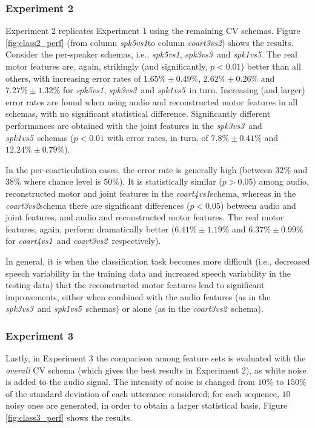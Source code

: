 \documentclass[10pt]{article}
\newcommand{\spka}{\emph{spk5vs1}}
\newcommand{\spkb}{\emph{spk3vs3}}
\newcommand{\spkc}{\emph{spk1vs5}}
\newcommand{\coa}{\emph{coart4vs1}}
\newcommand{\cob}{\emph{coart3vs2}}
\begin{document}
\subsubsection*{Experiment 2}
\label{subsec:exp2}

Experiment 2 replicates Experiment 1 using the remaining CV schemas.
Figure \ref{fig:class2_perf} (from column \spka to column \cob) shows the results.
Consider the per-speaker schemas, i.e., \spka, \spkb\ and \spkc. The real motor
features are, again, strikingly (and significantly, $p<0.01$) better than all others,
with increasing error rates of
$1.65\% \pm 0.49\%$,
$2.62\% \pm 0.26\%$ and
$7.27\% \pm 1.32\%$ for \spka, \spkb\ and \spkc\ in turn. Increasing (and larger) error
rates are found when using audio and reconstructed motor features in all schemas, with
no significant statistical difference. Significantly different performances are obtained
with the joint features in the \spkb\ and \spkc\ schemas ($p<0.01$ with error rates, in turn,
of $7.8\% \pm 0.41\%$ and $12.24\% \pm 0.79\%$).

In the per-coarticulation cases, the error rate is generally high (between $32\%$ and $38\%$
where chance level is $50\%$). It is statistically similar ($p>0.05$) among audio, reconstructed
motor and joint features in the \coa schema, whereas in the \cob schema there are significant 
differences ($p<0.05$) between audio and joint features, and audio and reconstructed motor features.
The real motor features, again, perform dramatically better
($6.41\% \pm 1.19\%$ and $6.37\% \pm 0.99\%$ for \coa\ and \cob\ respectively).

In general, it is when the classification task becomes more difficult (i.e., decreased speech variability in the 
 training data and increased speech variability in the testing data) that the reconstructed motor features 
lead to significant improvements, either when combined with the audio features (as in the \spkb\ and \spkc\ 
schemas) or alone (as in the \cob\ schema).

\subsubsection*{Experiment 3}
\label{subsec:exp3}

Lastly, in Experiment 3 the comparison among feature sets is evaluated with the
\emph{overall} CV schema (which gives the best results in Experiment 2), as white noise is added
to the audio signal. The intensity of noise is changed from $10\%$ to $150\%$ of
the standard deviation of each utterance considered; for each sequence, $10$ noisy
ones are generated, in order to obtain a larger statistical basis.
Figure \ref{fig:class3_perf} shows the results.
\end{document}
